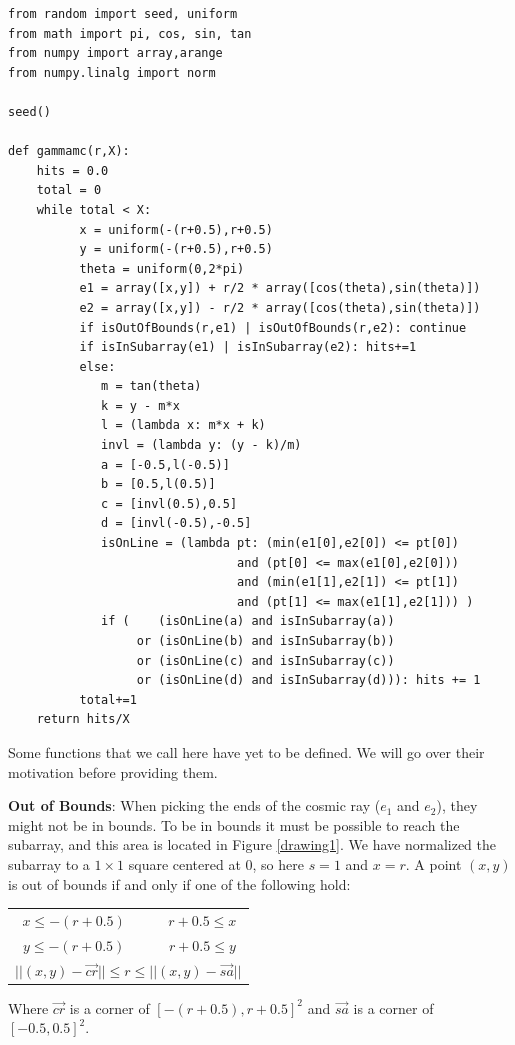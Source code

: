 \documentclass[a4paper,12pt,final]{article}
\begin{document}
\begin{verbatim}
from random import seed, uniform
from math import pi, cos, sin, tan
from numpy import array,arange
from numpy.linalg import norm

seed()

def gammamc(r,X):
    hits = 0.0
    total = 0
    while total < X:
          x = uniform(-(r+0.5),r+0.5)
          y = uniform(-(r+0.5),r+0.5)
          theta = uniform(0,2*pi)
          e1 = array([x,y]) + r/2 * array([cos(theta),sin(theta)])
          e2 = array([x,y]) - r/2 * array([cos(theta),sin(theta)])
          if isOutOfBounds(r,e1) | isOutOfBounds(r,e2): continue
          if isInSubarray(e1) | isInSubarray(e2): hits+=1
          else:
             m = tan(theta)
             k = y - m*x
             l = (lambda x: m*x + k)
             invl = (lambda y: (y - k)/m)
             a = [-0.5,l(-0.5)]
             b = [0.5,l(0.5)]
             c = [invl(0.5),0.5]
             d = [invl(-0.5),-0.5]
             isOnLine = (lambda pt: (min(e1[0],e2[0]) <= pt[0]) 
                                and (pt[0] <= max(e1[0],e2[0])) 
                                and (min(e1[1],e2[1]) <= pt[1])
                                and (pt[1] <= max(e1[1],e2[1])) )
             if (    (isOnLine(a) and isInSubarray(a))
                  or (isOnLine(b) and isInSubarray(b))
                  or (isOnLine(c) and isInSubarray(c))
                  or (isOnLine(d) and isInSubarray(d))): hits += 1
          total+=1
    return hits/X

\end{verbatim}

 \pagebreak
Some functions that we call here have yet to be defined.  We will
go over their motivation before providing them.

\textbf{Out of Bounds}: When picking the ends of the cosmic ray ($e_1$
and $e_2$), they might not be in bounds.  To be in bounds it must be
possible to reach the subarray, and this area is located in Figure
\ref{drawing1}.
We have normalized the subarray to a $1\times 1$ square centered at
$0$, so here $s = 1$ and $x = r$.  A point $(x,y)$ is out of bounds if and
only if one of the following hold:
\begin{center}
\begin{tabular}{ccc}
  $x \leq -(r + 0.5)$ &  & $r + 0.5 \leq x$ \\
  $y \leq -(r+0.5)$ & & $r + 0.5 \leq y$ \\
\multicolumn{3}{c}{$||(x,y)-\vec{cr}|| \leq r \leq ||(x,y)-\vec{sa}|| $}
\end{tabular}
\end{center}
Where $\vec{cr}$ is a corner of $[-(r+0.5),r+0.5]^2$ and $\vec{sa}$ is
a corner of $[-0.5,0.5]^2$.
\end{document}
